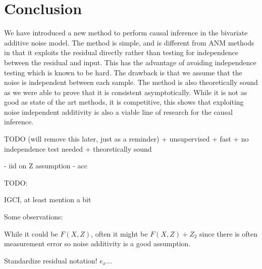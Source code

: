 \chapter{Conclusion}

We have introduced a new method to perform causal inference in the bivariate additive 
noise model. The method is simple, and is different from ANM methods in that it 
exploits the residual directly rather than testing for independence between 
the residual and input. This has the advantage of avoiding independence testing 
which is known to be hard. The drawback is that we assume that the noise is independent 
between each sample. The method is also theoretically sound as we were able to prove that 
it is consistent asymptotically. While it is not as good as state of the art methods, it is
competitive, this shows that exploiting noise independent additivity is also a viable 
line of research for the causal inference. 

TODO (will remove this later, just as a reminder)
+ unsupervised 
+ fast 
+ no independence test needed
+ theoretically sound

- iid on Z assumption
- acc

TODO:

IGCI, at least mention a bit

Some observations:

While it could be $F(X, Z)$, often it might be $F(X, Z) + Z_2$ since there is often measurement error
so noise additivity is a good assumption. 

Standardize residual notation! $e_x$...


